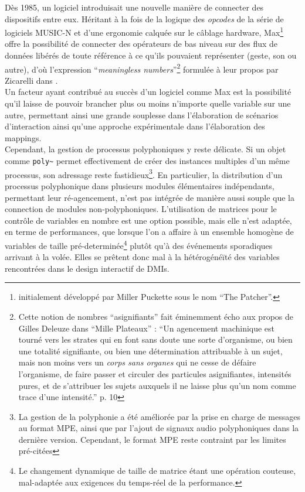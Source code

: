\noindent Dès 1985, un logiciel introduisait une nouvelle manière de connecter des dispositifs entre eux. Héritant à la fois de la logique des \textit{opcodes} de la série de logiciels \gls{MUSIC-N} et d'une ergonomie calquée sur le câblage hardware, Max\footnote{initialement développé par Miller Puckette sous le nom ``The Patcher''.} offre la possibilité de connecter des opérateurs de bas niveau sur des flux de données libérés de toute référence à ce qu'ils pouvaient représenter (geste, son ou autre), d'où l'expression ``\textit{meaningless numbers}''\footnote{Cette notion de nombres ``asignifiants'' fait éminemment écho aux propos de Gilles Deleuze dans ``Mille Plateaux'' \cite{deleuze_mille_1980} : ``Un agencement machinique est tourné vers les strates qui en font sans doute une sorte d'organisme, ou bien une totalité signifiante, ou bien une détermination attribuable à un sujet, mais non moins vers un \textit{corps sans organes} qui ne cesse de défaire l'organisme, de faire passer et circuler des particules asignifiantes, intensités pures, et de s'attribuer les sujets auxquels il ne laisse plus qu'un nom comme trace d'une intensité.'' p. 10} formulée à leur propos par Zicarelli dans \cite{zicarelli_communicating_1991}.\\
\indent Un facteur ayant contribué au succès d'un logiciel comme Max est la possibilité qu'il laisse de pouvoir brancher plus ou moins n'importe quelle variable sur une autre, permettant ainsi une grande souplesse dans l'élaboration de scénarios d'interaction ainsi qu'une approche expérimentale dans l'élaboration des \glspl{mapping}.\\
\indent Cependant, la gestion de processus polyphoniques y reste délicate. Si un objet comme \verb|poly~| permet effectivement de créer des instances multiples d'un même processus, son adressage reste fastidieux\footnote{La gestion de la polyphonie a été améliorée par la prise en charge de messages au format \gls{MPE}, ainsi que par l'ajout de signaux audio polyphoniques dans la dernière version. Cependant, le format \gls{MPE} reste contraint par les limites pré-citées}. En particulier, la distribution d'un processus polyphonique dans plusieurs modules élémentaires indépendants, permettant leur ré-agencement, n'est pas intégrée de manière aussi souple que la connection de modules non-polyphoniques. L'utilisation de matrices pour le contrôle de variables en nombre est une option possible, mais elle n'est adaptée, en terme de performances, que lorsque l'on a affaire à un ensemble homogène de variables de taille pré-determinée\footnote{Le changement dynamique de taille de matrice étant une opération couteuse, mal-adaptée aux exigences du temps-réel de la performance.} plutôt qu'à des événements sporadiques arrivant à la volée. Elles se prêtent donc mal à la hétérogénéïté des variables rencontrées dans le design interactif de \glspl{DMI}.

